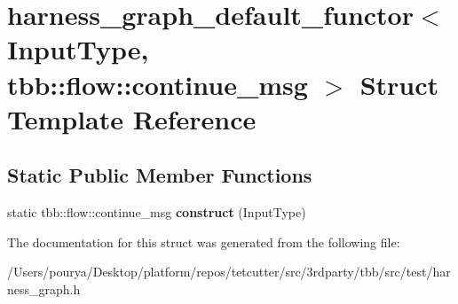 \hypertarget{structharness__graph__default__functor_3_01InputType_00_01tbb_1_1flow_1_1continue__msg_01_4}{}\section{harness\+\_\+graph\+\_\+default\+\_\+functor$<$ Input\+Type, tbb\+:\+:flow\+:\+:continue\+\_\+msg $>$ Struct Template Reference}
\label{structharness__graph__default__functor_3_01InputType_00_01tbb_1_1flow_1_1continue__msg_01_4}
\subsection*{Static Public Member Functions}
\begin{DoxyCompactItemize}
\item 
\hypertarget{structharness__graph__default__functor_3_01InputType_00_01tbb_1_1flow_1_1continue__msg_01_4_acef042a6c935d5320af8ba3eca591f59}{}static tbb\+::flow\+::continue\+\_\+msg {\bfseries construct} (Input\+Type)\label{structharness__graph__default__functor_3_01InputType_00_01tbb_1_1flow_1_1continue__msg_01_4_acef042a6c935d5320af8ba3eca591f59}

\end{DoxyCompactItemize}


The documentation for this struct was generated from the following file\+:\begin{DoxyCompactItemize}
\item 
/\+Users/pourya/\+Desktop/platform/repos/tetcutter/src/3rdparty/tbb/src/test/harness\+\_\+graph.\+h\end{DoxyCompactItemize}
